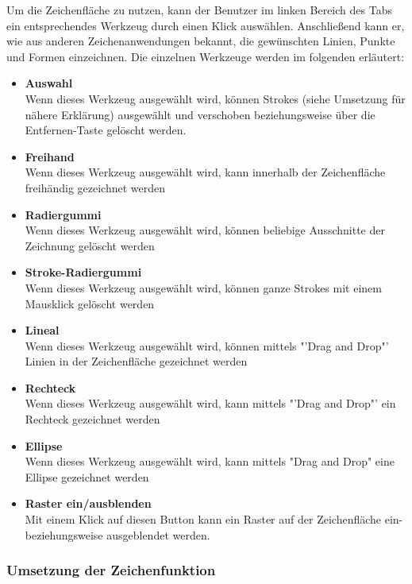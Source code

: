 Um die Zeichenfläche zu nutzen, kann der Benutzer im linken Bereich des Tabs ein entsprechendes Werkzeug durch einen Klick auswählen. Anschließend kann er, wie aus anderen Zeichenanwendungen bekannt, die gewünschten Linien, Punkte und Formen einzeichnen. Die einzelnen Werkzeuge werden im folgenden erläutert:
\begin{itemize}
\item \textbf{Auswahl}\\ 
Wenn dieses Werkzeug ausgewählt wird, können Strokes (siehe Umsetzung für nähere Erklärung) ausgewählt und verschoben beziehungsweise über die Entfernen-Taste gelöscht werden.
\item \textbf{Freihand}\\
Wenn dieses Werkzeug ausgewählt wird, kann innerhalb der Zeichenfläche freihändig gezeichnet werden
\item \textbf{Radiergummi}\\
Wenn dieses Werkzeug ausgewählt wird, können beliebige Ausschnitte der Zeichnung gelöscht werden
\item \textbf{Stroke-Radiergummi}\\
Wenn dieses Werkzeug ausgewählt wird, können ganze Strokes mit einem Mausklick gelöscht werden
\newpage
\item \textbf{Lineal}\\
Wenn dieses Werkzeug ausgewählt wird, können mittels "'Drag and Drop"' Linien in der Zeichenfläche gezeichnet werden
\item \textbf{Rechteck}\\
Wenn dieses Werkzeug ausgewählt wird, kann mittels "'Drag and Drop"' ein Rechteck gezeichnet werden
\item \textbf{Ellipse}\\
Wenn dieses Werkzeug ausgewählt wird, kann mittels "Drag and Drop" eine Ellipse gezeichnet werden
\item \textbf{Raster ein/ausblenden}\\
Mit einem Klick auf diesen Button kann ein Raster auf der Zeichenfläche ein- beziehungsweise ausgeblendet werden.
\end{itemize}

\subsubsection{Umsetzung der Zeichenfunktion}


